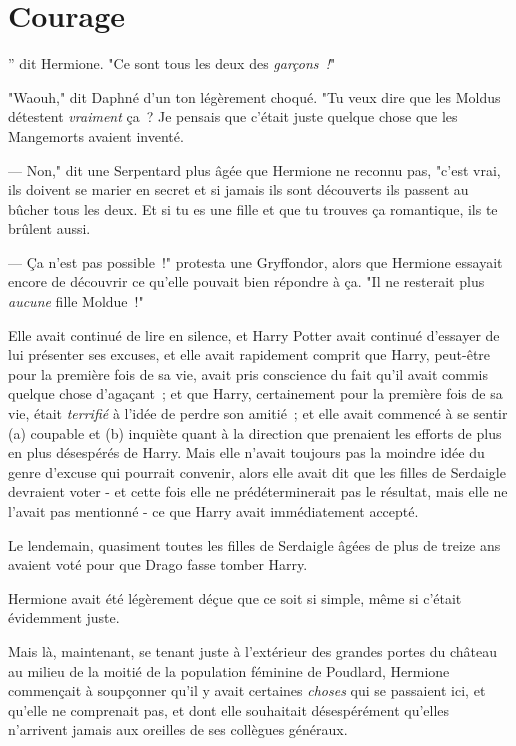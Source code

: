 \chapter{Courage}

” dit Hermione. "Ce sont tous les deux des \emph{garçons~!}"

\hplettrineextrapara
"Waouh," dit Daphné d'un ton légèrement choqué. "Tu veux dire que les Moldus détestent \emph{vraiment} ça~? Je pensais que c'était juste quelque chose que les Mangemorts avaient inventé.

--- Non," dit une Serpentard plus âgée que Hermione ne reconnu pas, "c'est vrai, ils doivent se marier en secret et si jamais ils sont découverts ils passent au bûcher tous les deux. Et si tu es une fille et que tu trouves ça romantique, ils te brûlent aussi.

--- Ça n'est pas possible~!" protesta une Gryffondor, alors que Hermione essayait encore de découvrir ce qu'elle pouvait bien répondre à ça. "Il ne resterait plus \emph{aucune} fille Moldue~!"

Elle avait continué de lire en silence, et Harry Potter avait continué d'essayer de lui présenter ses excuses, et elle avait rapidement comprit que Harry, peut-être pour la première fois de sa vie, avait pris conscience du fait qu'il avait commis quelque chose d'agaçant~; et que Harry, certainement pour la première fois de sa vie, était \emph{terrifié} à l'idée de perdre son amitié~; et elle avait commencé à se sentir (a) coupable et (b) inquiète quant à la direction que prenaient les efforts de plus en plus désespérés de Harry. Mais elle n'avait toujours pas la moindre idée du genre d'excuse qui pourrait convenir, alors elle avait dit que les filles de Serdaigle devraient voter - et cette fois elle ne prédéterminerait pas le résultat, mais elle ne l'avait pas mentionné - ce que Harry avait immédiatement accepté.

Le lendemain, quasiment toutes les filles de Serdaigle âgées de plus de treize ans avaient voté pour que Drago fasse tomber Harry.

Hermione avait été légèrement déçue que ce soit si simple, même si c'était évidemment juste.

Mais là, maintenant, se tenant juste à l'extérieur des grandes portes du château au milieu de la moitié de la population féminine de Poudlard, Hermione commençait à soupçonner qu'il y avait certaines \emph{choses} qui se passaient ici, et qu'elle ne comprenait pas, et dont elle souhaitait désespérément qu'elles n'arrivent jamais aux oreilles de ses collègues généraux.

